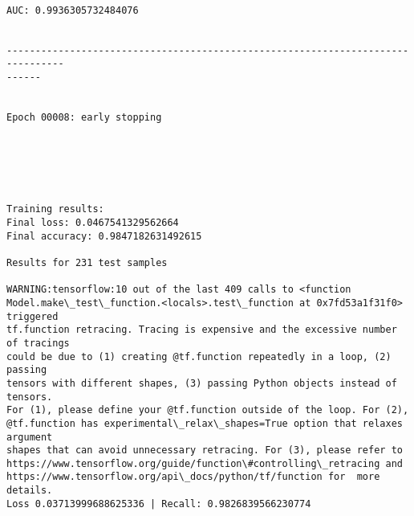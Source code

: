 \documentclass[11pt]{article}
\begin{document}
    \begin{center}
    \end{center}
    { \hspace*{\fill} \\}
    
    \begin{Verbatim}[commandchars=\\\{\}]
AUC: 0.9936305732484076


--------------------------------------------------------------------------------
------


Epoch 00008: early stopping
    \end{Verbatim}

    \begin{center}
    \end{center}
    { \hspace*{\fill} \\}
    
    \begin{center}
    \end{center}
    { \hspace*{\fill} \\}
    
    \begin{Verbatim}[commandchars=\\\{\}]

Training results:
Final loss: 0.0467541329562664
Final accuracy: 0.9847182631492615

Results for 231 test samples

WARNING:tensorflow:10 out of the last 409 calls to <function
Model.make\_test\_function.<locals>.test\_function at 0x7fd53a1f31f0> triggered
tf.function retracing. Tracing is expensive and the excessive number of tracings
could be due to (1) creating @tf.function repeatedly in a loop, (2) passing
tensors with different shapes, (3) passing Python objects instead of tensors.
For (1), please define your @tf.function outside of the loop. For (2),
@tf.function has experimental\_relax\_shapes=True option that relaxes argument
shapes that can avoid unnecessary retracing. For (3), please refer to
https://www.tensorflow.org/guide/function\#controlling\_retracing and
https://www.tensorflow.org/api\_docs/python/tf/function for  more details.
Loss 0.03713999688625336 | Recall: 0.9826839566230774



    \end{Verbatim}
\end{document}
